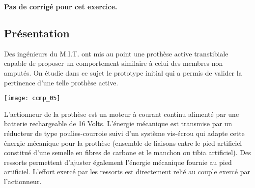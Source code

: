 \normaltrue \difficilefalse \tdifficilefalse
\correctiontrue




\setcounter{question}{0}
\ifcorrection
\else
\textbf{Pas de corrigé pour cet exercice.}
\fi




\subsection*{Présentation}

\ifprof
\else
Des ingénieurs du M.I.T. ont mis au point une prothèse active transtibiale capable de proposer un comportement
similaire à celui des membres non amputés. On étudie dans ce sujet le prototype initial
qui a permis de valider la pertinence d'une telle prothèse active.


\begin{center}
\texttt{[image: ccmp\_05]}

\end{center}



L'actionneur de la prothèse est un moteur à courant
continu alimenté par une batterie rechargeable de 16
Volts. L'énergie mécanique est transmise par un
réducteur de type poulies-courroie suivi d'un
système vis-écrou qui adapte cette énergie
mécanique pour la prothèse (ensemble de liaisons
entre le pied artificiel constitué d'une semelle en
fibres de carbone et le manchon ou tibia artificiel).
Des ressorts permettent d'ajuster également l'énergie
mécanique fournie au pied artificiel. L'effort exercé
par les ressorts est directement relié au couple
exercé par l'actionneur.

